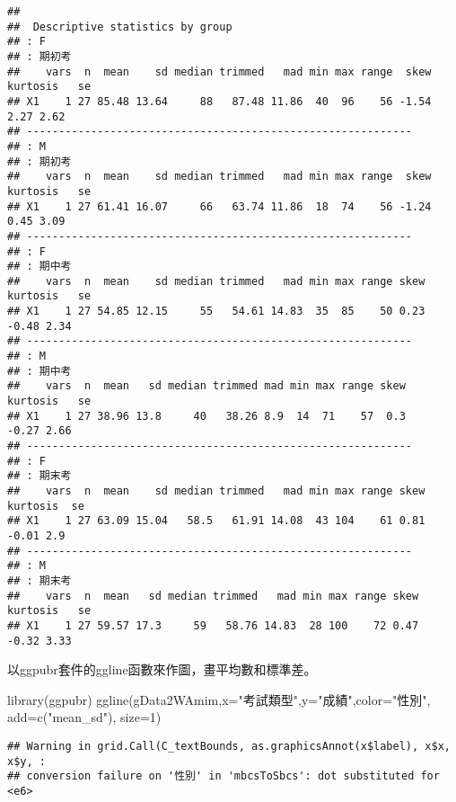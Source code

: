 \documentclass[
]{book}
\newenvironment{Shaded}{\begin{snugshade}}{\end{snugshade}}
\newcommand{\AttributeTok}[1]{\textcolor[rgb]{0.77,0.63,0.00}{#1}}
\newcommand{\DecValTok}[1]{\textcolor[rgb]{0.00,0.00,0.81}{#1}}
\newcommand{\FunctionTok}[1]{\textcolor[rgb]{0.00,0.00,0.00}{#1}}
\newcommand{\NormalTok}[1]{#1}
\newcommand{\StringTok}[1]{\textcolor[rgb]{0.31,0.60,0.02}{#1}}
\begin{document}
\begin{verbatim}
## 
##  Descriptive statistics by group 
## : F
## : 期初考
##    vars  n  mean    sd median trimmed   mad min max range  skew kurtosis   se
## X1    1 27 85.48 13.64     88   87.48 11.86  40  96    56 -1.54     2.27 2.62
## ------------------------------------------------------------ 
## : M
## : 期初考
##    vars  n  mean    sd median trimmed   mad min max range  skew kurtosis   se
## X1    1 27 61.41 16.07     66   63.74 11.86  18  74    56 -1.24     0.45 3.09
## ------------------------------------------------------------ 
## : F
## : 期中考
##    vars  n  mean    sd median trimmed   mad min max range skew kurtosis   se
## X1    1 27 54.85 12.15     55   54.61 14.83  35  85    50 0.23    -0.48 2.34
## ------------------------------------------------------------ 
## : M
## : 期中考
##    vars  n  mean   sd median trimmed mad min max range skew kurtosis   se
## X1    1 27 38.96 13.8     40   38.26 8.9  14  71    57  0.3    -0.27 2.66
## ------------------------------------------------------------ 
## : F
## : 期末考
##    vars  n  mean    sd median trimmed   mad min max range skew kurtosis  se
## X1    1 27 63.09 15.04   58.5   61.91 14.08  43 104    61 0.81    -0.01 2.9
## ------------------------------------------------------------ 
## : M
## : 期末考
##    vars  n  mean   sd median trimmed   mad min max range skew kurtosis   se
## X1    1 27 59.57 17.3     59   58.76 14.83  28 100    72 0.47    -0.32 3.33
\end{verbatim}

以ggpubr套件的ggline函數來作圖，畫平均數和標準差。

\begin{Shaded}
\begin{Highlighting}[]
\FunctionTok{library}\NormalTok{(ggpubr)}
\FunctionTok{ggline}\NormalTok{(gData2WAmim,}\AttributeTok{x=}\StringTok{"考試類型"}\NormalTok{,}\AttributeTok{y=}\StringTok{"成績"}\NormalTok{,}\AttributeTok{color=}\StringTok{"性別"}\NormalTok{, }\AttributeTok{add=}\FunctionTok{c}\NormalTok{(}\StringTok{"mean\_sd"}\NormalTok{), }\AttributeTok{size=}\DecValTok{1}\NormalTok{)}
\end{Highlighting}
\end{Shaded}

\begin{verbatim}
## Warning in grid.Call(C_textBounds, as.graphicsAnnot(x$label), x$x, x$y, :
## conversion failure on '性別' in 'mbcsToSbcs': dot substituted for <e6>
\end{verbatim}
\end{document}
